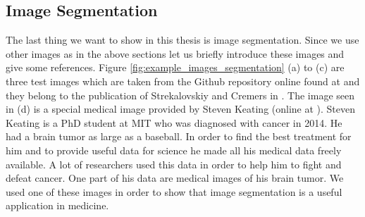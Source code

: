 \documentclass[abstracton]{scrreprt}
\begin{document}
        \subsection{Image Segmentation} %
        \label{sub:image_segmentation}
            The last thing we want to show in this thesis is image segmentation. Since we use other images as in the above sections let us briefly introduce these images and give some references. Figure \ref{fig:example_images_segmentation} (a) to (c) are three test images which are taken from the Github repository online found at \cite{FastMS} and they belong to the publication of Strekalovskiy and Cremers in \cite{Strekalovskiy-Cremers-eccv14}. The image seen in (d) is a special medical image provided by Steven Keating (online at \cite{Keating}). Steven Keating is a PhD student at MIT who was diagnosed with cancer in 2014. He had a brain tumor as large as a baseball. In order to find the best treatment for him and to provide useful data for science he made all his medical data freely available. A lot of researchers used this data in order to help him to fight and defeat cancer. One part of his data are medical images of his brain tumor. We used one of these images in order to show that image segmentation is a useful application in medicine.
\end{document}

